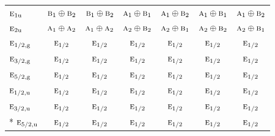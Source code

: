 \documentclass[10pt,a4paper]{article}
\numberwithin{equation}{section}
\newcommand{\irr}[1]{\text{\normalfont\scshape #1}}
\newcommand{\ptag}[1]{\mathrm{#1}}
\begin{document}
{\begin{longtable}{@{}lcccccc@{}}
$\irr{e}_{1\ptag{u}}$ & $\irr{b}_{1}\oplus \irr{b}_{2}$ & $\irr{b}_{1}\oplus \irr{b}_{2}$ & $\irr{a}_{1}\oplus \irr{b}_{1}$ & $\irr{a}_{1}\oplus \irr{b}_{2}$ & $\irr{a}_{1}\oplus \irr{b}_{1}$ & $\irr{a}_{1}\oplus \irr{b}_{2}$\\
$\irr{e}_{2\ptag{u}}$ & $\irr{a}_{1}\oplus \irr{a}_{2}$ & $\irr{a}_{1}\oplus \irr{a}_{2}$ & $\irr{a}_{2}\oplus \irr{b}_{2}$ & $\irr{a}_{2}\oplus \irr{b}_{1}$ & $\irr{a}_{2}\oplus \irr{b}_{2}$ & $\irr{a}_{2}\oplus \irr{b}_{1}$\\
$\irr{e}_{1/2,\ptag{g}}$ & $\irr{e}_{1/2}$ & $\irr{e}_{1/2}$ & $\irr{e}_{1/2}$ & $\irr{e}_{1/2}$ & $\irr{e}_{1/2}$ & $\irr{e}_{1/2}$\\
$\irr{e}_{3/2,\ptag{g}}$ & $\irr{e}_{1/2}$ & $\irr{e}_{1/2}$ & $\irr{e}_{1/2}$ & $\irr{e}_{1/2}$ & $\irr{e}_{1/2}$ & $\irr{e}_{1/2}$\\
$\irr{e}_{5/2,\ptag{g}}$ & $\irr{e}_{1/2}$ & $\irr{e}_{1/2}$ & $\irr{e}_{1/2}$ & $\irr{e}_{1/2}$ & $\irr{e}_{1/2}$ & $\irr{e}_{1/2}$\\
$\irr{e}_{1/2,\ptag{u}}$ & $\irr{e}_{1/2}$ & $\irr{e}_{1/2}$ & $\irr{e}_{1/2}$ & $\irr{e}_{1/2}$ & $\irr{e}_{1/2}$ & $\irr{e}_{1/2}$\\
$\irr{e}_{3/2,\ptag{u}}$ & $\irr{e}_{1/2}$ & $\irr{e}_{1/2}$ & $\irr{e}_{1/2}$ & $\irr{e}_{1/2}$ & $\irr{e}_{1/2}$ & $\irr{e}_{1/2}$\\*
$\irr{e}_{5/2,\ptag{u}}$ & $\irr{e}_{1/2}$ & $\irr{e}_{1/2}$ & $\irr{e}_{1/2}$ & $\irr{e}_{1/2}$ & $\irr{e}_{1/2}$ & $\irr{e}_{1/2}$\\
\bottomrule\end{longtable}}
\end{document}
